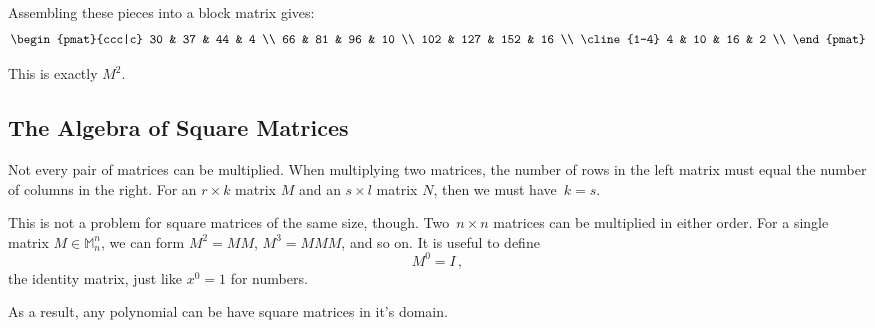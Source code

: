 \begin{itemize}
Assembling these pieces into a block matrix gives:
\[
\begin{pmat}{ccc|c}
30 & 37 & 44 & 4 \\
66 & 81 & 96 & 10 \\
102 & 127 & 152 & 16 \\
\cline{1-4}
4 & 10 & 16 & 2 \\
\end{pmat}
\]

This is exactly $M^2$.
\end{itemize}

\subsection{The Algebra of Square Matrices }

Not every pair of matrices can be multiplied.  When multiplying two matrices, the number of rows in the left matrix must equal the number of columns in the right.  For an $r\times k$ matrix $M$ and an $s\times l$ matrix $N$, then we must have~$k=s$.

This is not a problem for square matrices of the same size, though.  Two~$n\times n$ matrices can be multiplied in either order.  For a single matrix $M \in \mathbb{M}^n_n$, we can form $M^2=MM$, $M^3=MMM$, and so on. It is useful to define \[M^0=I\, ,\] the identity matrix, just like $x^0=1$ for numbers.

As a result, any polynomial  can be have square matrices in it's domain. 

